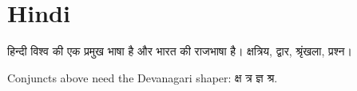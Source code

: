 \documentclass{article}
\begin{document}
\section{Hindi}
\begin{hindi}
हिन्दी विश्व की एक प्रमुख भाषा है और भारत की राजभाषा है। क्षत्रिय, द्वार, श्रृंखला, प्रश्न।
\end{hindi}
Conjuncts above need the Devanagari shaper: \texthindi{क्ष त्र ज्ञ श्र}.
\end{document}
